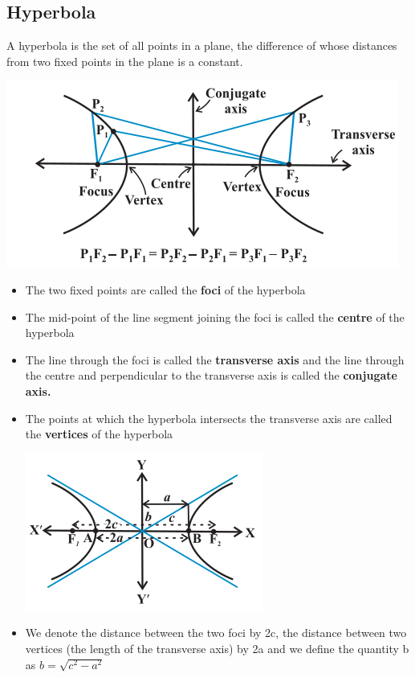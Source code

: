 \documentclass[12pt]{article}
\begin{document}
\begin{multicols}{2}
\subsection*{Hyperbola}
A hyperbola is the set of all points in a plane, the difference of whose
distances from two fixed points in the plane is a constant.
\begin{center}
    \includegraphics[scale=0.5]{f4.png}
\end{center}
\begin{itemize}
    \item The two fixed points are called the
    \textbf{foci} of the hyperbola
    \item The mid-point of the line segment joining the foci is called the
    \textbf{centre} of the hyperbola
    \item The line through the foci is called the \textbf{transverse axis} and
    the line through the centre and perpendicular to the transverse axis is called the \textbf{conjugate
    axis.}
    \item The points at which the hyperbola
    intersects the transverse axis are called the
    \textbf{vertices} of the hyperbola
    \begin{center}
        \includegraphics[scale=0.7]{f5.png}
    \end{center}
    \item We denote the distance between the
    two foci by 2c, the distance between two
    vertices (the length of the transverse axis)
    by 2a and we define the quantity b as
   $ b =\sqrt{
    c^2 - a^2}$
\end{itemize}

\end{multicols}
\end{document}
